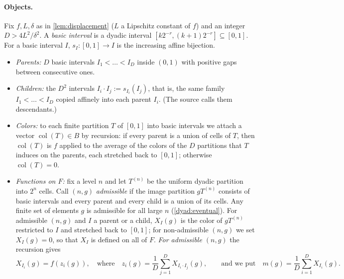 \documentclass[11pt]{article}
\DeclareMathOperator{\colr}{col}
\theoremstyle{definition}
\numberwithin{equation}{section}
\begin{document}
\paragraph{Objects.}
Fix \(f,L,\delta\) as in \cref{lem:displacement} (\(L\) a Lipschitz constant
of \(f\)) and an integer \(D>4L^2/\delta^2\). A \emph{basic interval} is a
dyadic interval \([k2^{-r},(k+1)2^{-r}]\subseteq[0,1]\). For a basic
interval \(I\), \(s_I:[0,1]\to I\) is the increasing affine bijection.
\begin{itemize}
\item \emph{Parents:} \(D\) basic intervals \(I_1<\dots<I_D\) inside
\((0,1)\) with positive gaps between consecutive ones.
\item \emph{Children:} the \(D^2\) intervals \(I_i\cdot I_j:=s_{I_i}(I_j)\),
that is, the same family \(I_1<\dots<I_D\) copied affinely into each parent
\(I_i\). (The source calls them descendants.)
\item \emph{Colors:} to each finite partition \(T\) of \([0,1]\) into basic
intervals we attach a vector \(\colr(T)\in B\) by recursion: if every parent
is a union of cells of \(T\), then \(\colr(T)\) is \(f\) applied to the
average of the colors of the \(D\) partitions that \(T\) induces on the
parents, each stretched back to \([0,1]\); otherwise \(\colr(T)=0\).
\item \emph{Functions on \(F\):} fix a level \(n\) and let \(T^{(n)}\) be the
uniform dyadic partition into \(2^n\) cells. Call \((n,g)\) \emph{admissible}
if the image partition \(gT^{(n)}\) consists of basic intervals and every
parent and every child is a union of its cells. Any finite set of elements
\(g\) is admissible for all large \(n\) (\cref{dyad:eventual}). For
admissible \((n,g)\) and \(I\) a parent or a child, \(X_I(g)\) is the color
of \(gT^{(n)}\) restricted to \(I\) and stretched back to \([0,1]\); for
non-admissible \((n,g)\) we set \(X_I(g)=0\), so that \(X_I\) is defined on
all of \(F\). \emph{For admissible \((n,g)\)} the recursion gives
\[
 X_{I_i}(g)=f(z_i(g)),\quad\text{where}\quad
 z_i(g)=\frac1D\sum_{j=1}^D X_{I_i\cdot I_j}(g),\qquad\text{and we put}\quad
 m(g)=\frac1D\sum_{i=1}^D X_{I_i}(g).
\]
\end{itemize}
\end{document}
